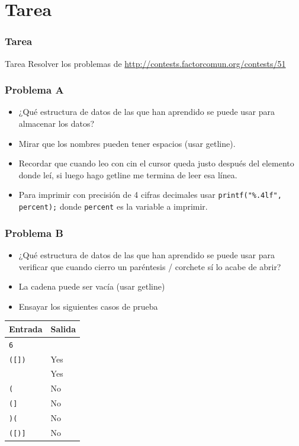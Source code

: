 \documentclass{beamer}
\begin{document}
\section{Tarea}
	\begin{frame}
		\frametitle{Tarea}
		\begin{alertblock}{Tarea}
			Resolver los problemas de \url{http://contests.factorcomun.org/contests/51}
		\end{alertblock}
	\end{frame}
	
	\begin{frame}[fragile]
		\frametitle{Problema A}
		\begin{itemize}
			\item ¿Qué estructura de datos de las que han aprendido se puede usar para almacenar los datos?
			\item Mirar que los nombres pueden tener espacios (usar getline).
			\item Recordar que cuando leo con cin el cursor queda justo después del elemento donde leí, si luego hago getline me termina de leer esa línea.
			\item Para imprimir con precisión de 4 cifras decimales usar \verb|printf("%.4lf", percent);| donde \verb|percent| es la variable a imprimir.
		\end{itemize}
	\end{frame}
	
	\begin{frame}[fragile]
		\frametitle{Problema B}
		\begin{itemize}
			\item ¿Qué estructura de datos de las que han aprendido se puede usar para verificar que cuando cierro un paréntesis / corchete sí lo acabe de abrir?
			\item La cadena puede ser vacía (usar getline)
			\item Ensayar los siguientes casos de prueba
		\end{itemize}
		\begin{center}
			\begin{tabular}{|l|l|}
				\hline
				Entrada & Salida \\
				\hline
				\verb|6|       &      \\
				\verb|([])|    & Yes  \\
				\verb||        & Yes  \\
				\verb|(|       & No   \\
				\verb|(]|      & No   \\
				\verb|)(|      & No   \\
				\verb|([)]|    & No   \\
				\hline
			\end{tabular}
		\end{center}
	\end{frame}
	
\end{document}
